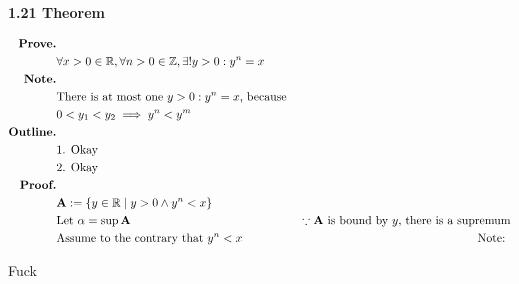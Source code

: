 \documentclass{article}
\newcommand{\set}[2]{
	\{ #1 \mid #2 \}
}
\begin{document}
  \subsection{}


  {\bf 1.21 Theorem}

  \begin{align*}
    \text{\bf Prove.} \\
      & \forall x > 0 \in \mathbb{R}, \forall n > 0 \in \mathbb{Z}, \exists! y > 0 : y^n = x \\
    \text{\bf Note.} \\
      & \text{There is at most one $y > 0 : y^n = x$, because } \\
      & 0 < y_1 < y_2 \implies y^n < y^m \\
    \text{\bf Outline.} \\
      & \text{1. Okay} \\
      & \text{2. Okay} \\
    \text{\bf Proof.} \\
      & \mathbf{A} := \set{y \in \mathbb{R}}{ y > 0 \land y^n < x } \\
      & \text{Let } \alpha = \sup\mathbf{A} & \because \text{$\mathbf{A}$ is bound by $y$, there is a supremum} \\
      & \text{Assume to the contrary that $y^n < x$} & \text{Note: }\\
  \end{align*}

  Fuck
\end{document}
